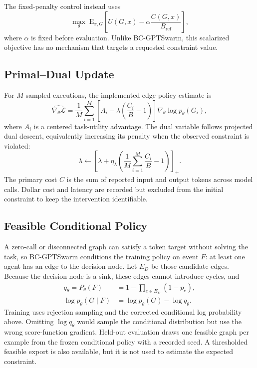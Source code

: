 The fixed-penalty control instead uses
\begin{equation}
 \max_{\theta}\;\mathrm{E}_{x,G}\!\left[
 U(G,x)-\alpha\frac{C(G,x)}{B_{\mathrm{ref}}}\right],
\end{equation}
where $\alpha$ is fixed before evaluation. Unlike BC-GPTSwarm, this scalarized objective has no mechanism that targets a requested constraint value.

\subsection{Primal--Dual Update}

For $M$ sampled executions, the implemented edge-policy estimate is
\begin{equation}
 \widehat{\nabla_{\theta}\mathcal{L}}=
 \frac{1}{M}\sum_{i=1}^{M}
 \left[A_i-\lambda\left(\frac{C_i}{B}-1\right)\right]
 \nabla_{\theta}\log p_{\theta}(G_i),
\end{equation}
where $A_i$ is a centered task-utility advantage. The dual variable follows projected dual descent, equivalently increasing its penalty when the observed constraint is violated:
\begin{equation}
 \lambda\leftarrow\left[\lambda+\eta_{\lambda}
 \left(\frac{1}{M}\sum_{i=1}^{M}\frac{C_i}{B}-1\right)\right]_{+}.
\end{equation}
The primary cost $C$ is the sum of reported input and output tokens across model calls. Dollar cost and latency are recorded but excluded from the initial constraint to keep the intervention identifiable.

\subsection{Feasible Conditional Policy}

A zero-call or disconnected graph can satisfy a token target without solving the task, so BC-GPTSwarm conditions the training policy on event $F$: at least one agent has an edge to the decision node. Let $E_D$ be those candidate edges. Because the decision node is a sink, these edges cannot introduce cycles, and
\begin{align}
 q_{\theta}=P_{\theta}(F)
 &=1-\prod_{e\in E_D}(1-p_e),\\
 \log p_{\theta}(G\mid F)
 &=\log p_{\theta}(G)-\log q_{\theta}.
\end{align}
Training uses rejection sampling and the corrected conditional log probability above. Omitting $\log q_{\theta}$ would sample the conditional distribution but use the wrong score-function gradient. Held-out evaluation draws one feasible graph per example from the frozen conditional policy with a recorded seed. A thresholded feasible export is also available, but it is not used to estimate the expected constraint.

